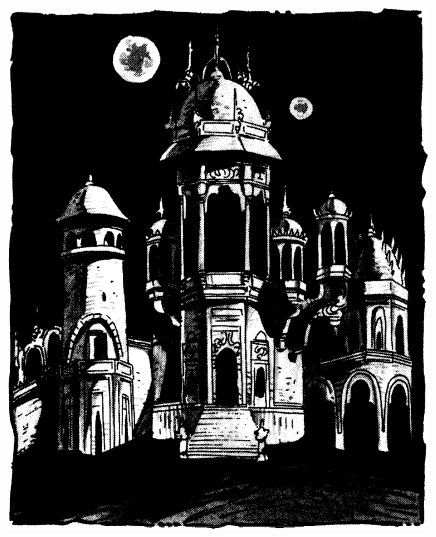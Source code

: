 \begin{figure}[b!]
\centering
\includegraphics[width=\columnwidth]{images/raam-1.png}
\WOTC
\end{figure}

